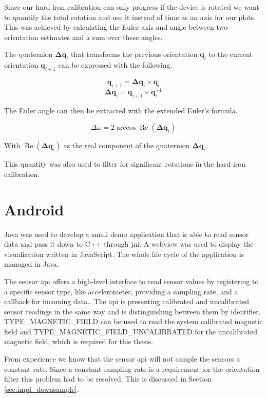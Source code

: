 Since our hard iron calibration can only progress if the device is rotated we want to quantify the total rotation and use it instead of time as an axis for our plots. This was achieved by calculating the Euler axis and angle between two orientation estimates and a sum over these angles.

The quaternion $\bm{\Delta q}_i$ that transforms the previous orientation $\bm{q}_i$ to the current orientation $\bm{q}_{i+1}$ can be expressed with the following.

\[\bm{q}_{i+1} = \bm{\Delta q}_i \times \bm{q}_i\]
\[\bm{\Delta q}_i = \bm{q}_{i+1} \times \bm{q}_i^{-1}\]

The Euler angle can then be extracted with the extended Euler's formula.

\[\Delta \omega = 2 \arccos{\operatorname{Re}(\bm{\Delta q}_i)}\]

With $\operatorname{Re}(\bm{\Delta q}_i)$ as the real component of the quaternion $\bm{\Delta q}_i$.

This quantity was also used to filter for significant rotations in the hard iron calibration.

\section{Android}

Java was used to develop a small demo application that is able to read sensor data and pass it down to C++ through \gls{jni}. A webview was used to display the visualization written in JavaScript. The whole life cycle of the application is managed in Java.

The sensor \gls{api} offers a high-level interface to read sensor values by registering to a specific sensor type, like accelerometer, providing a sampling rate, and a callback for incoming data.\cite{android_sdk_sensormanager}. The \gls{api} is presenting calibrated and uncalibrated sensor readings in the same way and is distinguishing between them by identifier. \textsc{TYPE\_MAGNETIC\_FIELD} can be used to read the system calibrated magnetic field and \textsc{TYPE\_MAGNETIC\_FIELD\_UNCALIBRATED} for the uncalibrated magnetic field, which is required for this thesis.

From experience we know that the sensor \gls{api} will not sample the sensors a constant rate. Since a constant sampling rate is a requirement for the orientation filter this problem had to be resolved. This is discussed in Section \ref{sec:impl_downsample}.

